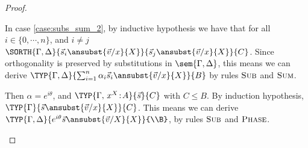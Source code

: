 \begin{proof}
\begin{description}
    In case \ref{case:subs_sum_2}, by inductive hypothesis we have that for all $i\in\{0,\dotsb,n\}$, and $i\neq j$ $\SORTH{\Gamma,\Delta}{\vec{s}_{i}\ansubst{\vec{v}/x}{X}}{\vec{s}_{j}\ansubst{\vec{v}/x}{X}}{C}$. Since orthogonality is preserved by substitutions in $\sem{\Gamma,\Delta}$, this means we can derive $\TYP{\Gamma,\Delta}{\sum_{i=1}^n\alpha_i \vec{s}_{i}\ansubst{\vec{v}/x}{X}}{B}$ by rules $\textsc{Sub}$ and $\textsc{Sum}$.

    \item[$\vec{t}=\alpha\vec{s}$:] Then $\alpha=e^{i\theta}$, and $\TYP{\Gamma,\,x^{X}\!:\!A}{\vec{s}}{C}$ with $C\leq B$. By induction hypothesis, $\TYP{\Gamma}{\vec{s}\ansubst{\vec{v}/x}{X}}{C}$. This means we can derive $\TYP{\Gamma,\Delta}{e^{i\theta}\vec{s}\ansubst{\vec{v}/X}{X}}{\\B}$, by rules $\textsc{Sub}$ and $\textsc{Phase}$.
      \qedhere
  \end{description}
\end{proof}

